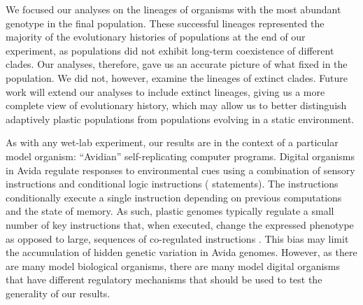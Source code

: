 We focused our analyses on the lineages of organisms with the most abundant genotype in the final population.
These successful lineages represented the majority of the evolutionary histories of populations at the end of our experiment, as populations did not exhibit long-term coexistence of different clades.
Our analyses, therefore, gave us an accurate picture of what fixed in the population.
We did not, however, examine the lineages of extinct clades.
Future work will extend our analyses to include extinct lineages, giving us a more complete view of evolutionary history, which may allow us to better distinguish adaptively plastic populations from populations evolving in a static environment. %

As with any wet-lab experiment, our results are in the context of a particular model organism: ``Avidian'' self-replicating computer programs.
Digital organisms in Avida regulate responses to environmental cues using a combination of sensory instructions and conditional logic instructions ( statements).
The  instructions conditionally execute a single instruction depending on previous computations and the state of memory.  
As such, plastic genomes typically regulate a small number of key instructions that, when executed, change the expressed phenotype as opposed to large, sequences of co-regulated instructions \citep{supplemental_material}.
This bias may limit the accumulation of hidden genetic variation in Avida genomes. 
However, as there are many model biological organisms, there are many model digital organisms that have different regulatory mechanisms that should be used to test the generality of our results.

